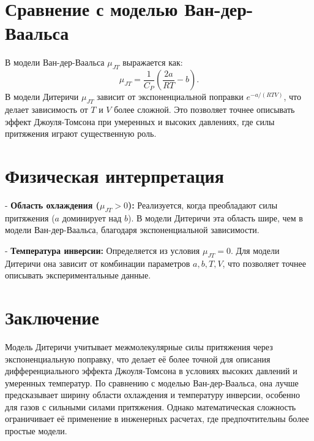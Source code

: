 \documentclass[12pt]{article}
\begin{document}
\section{Сравнение с моделью Ван-дер-Ваальса}
В модели Ван-дер-Ваальса $\mu_{JT}$ выражается как:
$$
\mu_{JT} = \frac{1}{C_P} \left( \frac{2a}{RT} - b \right).
$$
В модели Дитеричи $\mu_{JT}$ зависит от экспоненциальной поправки $e^{-a/(RTV)}$, что делает зависимость от $T$ и $V$ более сложной. Это позволяет точнее описывать эффект Джоуля-Томсона при умеренных и высоких давлениях, где силы притяжения играют существенную роль.

\section{Физическая интерпретация}

    
- \textbf{Область охлаждения ($\mu_{JT} > 0$):} Реализуется, когда преобладают силы притяжения ($a$ доминирует над $b$). В модели Дитеричи эта область шире, чем в модели Ван-дер-Ваальса, благодаря экспоненциальной зависимости.
    
- \textbf{Температура инверсии:} Определяется из условия $\mu_{JT} = 0$. Для модели Дитеричи она зависит от комбинации параметров $a, b, T, V$, что позволяет точнее описывать экспериментальные данные.


\section{Заключение}
Модель Дитеричи учитывает межмолекулярные силы притяжения через экспоненциальную поправку, что делает её более точной для описания дифференциального эффекта Джоуля-Томсона в условиях высоких давлений и умеренных температур. По сравнению с моделью Ван-дер-Ваальса, она лучше предсказывает ширину области охлаждения и температуру инверсии, особенно для газов с сильными силами притяжения. Однако математическая сложность ограничивает её применение в инженерных расчетах, где предпочтительны более простые модели.
\end{document}
